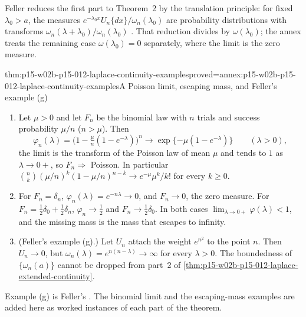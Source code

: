 Feller reduces the first part to Theorem~2 by the translation principle:
for fixed \(\lambda_0>a\), the measures \(e^{-\lambda_0x}U_n\{dx\}/\omega_n(\lambda_0)\)
are probability distributions with transforms
\(\omega_n(\lambda+\lambda_0)/\omega_n(\lambda_0)\)
\cite[vol.~II, XIII.1, p.~433]{Feller1971ProbabilityII}. That reduction
divides by \(\omega(\lambda_0)\); the annex treats the remaining case
\(\omega(\lambda_0)=0\) separately, where the limit is the zero measure.

\begin{hbtheorem}{thm:p15-w02b-p15-012-laplace-continuity-examples}{proved=annex:p15-w02b-p15-012-laplace-continuity-examples}{A Poisson limit, escaping mass, and Feller's example (g)}
\begin{enumerate}
\item Let \(\mu>0\) and let \(F_n\) be the binomial law with \(n\) trials and
      success probability \(\mu/n\) (\(n>\mu\)). Then
      \[
       \varphi_n(\lambda)=\bigl(1-\tfrac\mu n(1-e^{-\lambda})\bigr)^n
        \longrightarrow\exp\{-\mu(1-e^{-\lambda})\}\qquad(\lambda>0),
      \]
      the limit is the transform of the Poisson law of mean \(\mu\) and tends
      to \(1\) as \(\lambda\to0+\), so \(F_n\Rightarrow\) Poisson. In
      particular \(\binom nk(\mu/n)^k(1-\mu/n)^{n-k}\to e^{-\mu}\mu^k/k!\)
      for every \(k\geq0\).
\item For \(F_n=\delta_n\), \(\varphi_n(\lambda)=e^{-n\lambda}\to0\), and
      \(F_n\to0\), the zero measure. For
      \(F_n=\tfrac12\delta_0+\tfrac12\delta_n\), \(\varphi_n\to\tfrac12\) and
      \(F_n\to\tfrac12\delta_0\). In both cases
      \(\lim_{\lambda\to0+}\varphi(\lambda)<1\), and the missing mass is the
      mass that escapes to infinity.
\item (Feller's example (g).) Let \(U_n\) attach the weight \(e^{n^2}\) to the
      point \(n\). Then \(U_n\to0\), but
      \(\omega_n(\lambda)=e^{n(n-\lambda)}\to\infty\) for every
      \(\lambda>0\). The boundedness of \(\{\omega_n(a)\}\) cannot be dropped
      from part~2 of \cref{thm:p15-w02b-p15-012-laplace-extended-continuity}.
\end{enumerate}
\end{hbtheorem}

Example (g) is Feller's \cite[vol.~II, XIII.1, p.~434]{Feller1971ProbabilityII}.
The binomial limit and the escaping-mass examples are added here as worked
instances of each part of the theorem.

